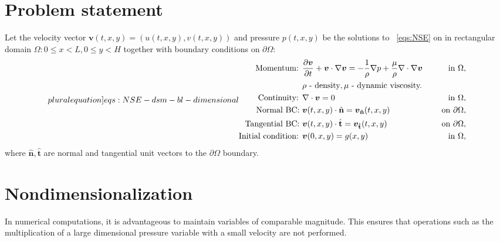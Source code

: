 \documentclass{article}
\numberwithin{equation}{section}
\begin{document}
\section{Problem statement}\label{sec:problem-statement-dimentional}
Let the velocity vector $\boldsymbol{v}(t,x,y)=(u(t,x,y),v(t,x,y))$ and pressure $p(t,x,y)$ be the solutions to ~\cref{eqs:NSE} on in rectangular domain $\Omega:0\leq x < L, 0\leq y < H$ together with boundary conditions on $\partial\Omega$:
\begin{subequations}
\label[pluralequation]{eqs:NSE-dsm-bl-dimensional}
\begin{align}
\label{eqn:momentum-dimensional}
\text{Momentum: }	&\frac{\partial \boldsymbol{v}}{\partial t} + \boldsymbol{v} \cdot \nabla \boldsymbol{v} = -\frac{1}{\rho}\nabla p + {\frac{\mu}{\rho}} \nabla \cdot \nabla \boldsymbol{v}\quad&\text{ in }\Omega,\\
&\rho\text{ - density}, \mu\text{ - dynamic viscosity.}\notag\\
\label{eqn:continuity-dsm-bl}
\text{Continuity: }	& \nabla \cdot \boldsymbol{v} = 0\quad&\text{ in }\Omega, \\ 
\label{eqn:NSE-bc-normal-dimensional}
\text{Normal BC: } & \boldsymbol{v}(t,x,y)\cdot\hat{\mathbf{n}}=\boldsymbol{v}_\mathbf{\hat{n}}(t,x,y) \quad&\text{ on }\partial\Omega, \\
\label{eqn:NSE-bc-tangential-dimensional}
\text{Tangential BC: } & \boldsymbol{v}(t,x,y)\cdot\hat{\mathbf{t}}=\boldsymbol{v}_\mathbf{\hat{t}}(t,x,y) \quad&\text{ on }\partial\Omega, \\
\label{eqn:NSE-ic-dimensional}
\text{Initial condition: } &\boldsymbol{v}(0,x,y)=g(x,y) \quad&\text{ in }\Omega,
\end{align}
\end{subequations}
where $\hat{\mathbf{n}},\hat{\mathbf{t}}$ are normal and tangential unit vectors to the $\partial\Omega$ boundary.




\section{Nondimensionalization}\label{sec:nondimensionalization}
In numerical computations, it is advantageous to maintain variables of comparable magnitude. This ensures that operations such as the multiplication of a large dimensional pressure variable with a small velocity are not performed. 
\end{document}
